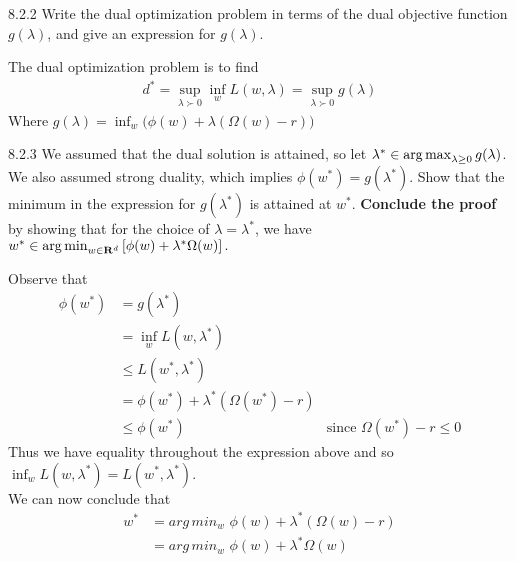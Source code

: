 \documentclass[12pt,letterpaper]{article}
\begin{document}
\begin{problem}{8.2.2}
Write the dual optimization problem in terms of the
dual objective function $g(\lambda)$, and give an expression for
$g(\lambda)$.
\end{problem}
\begin{solution}{}
    The dual optimization problem is to find
    \begin{align*}
        d^*= \sup_{\lambda\succ 0} \inf_w L(w,\lambda) = \sup_{\lambda\succ 0} g(\lambda)
    \end{align*}
    Where $g(\lambda) = \inf_w\big(\phi(w)+\lambda(\Omega(w)-r)\big)$
\end{solution}
\newpage

\begin{problem}{8.2.3}
We assumed that the dual solution is attained, so let
$\lambda^{*}\in\argmax_{\lambda\ge0}g(\lambda)$. We also assumed
strong duality, which implies $\phi(w^{*})=g(\lambda^{*})$. Show
that the minimum in the expression for $g(\lambda^{*})$ is attained
at $w^{*}$.
\textbf{Conclude the proof} by showing that for the choice of $\lambda=\lambda^{*}$,
we have $w^{*}\in\argmin_{w\in\reals^{d}}\left[\phi(w)+\lambda^{*}\Omega(w)\right].$
\end{problem}
\begin{solution}{}
    Observe that
    \begin{align*}
        \phi(w^*) &= g(\lambda^*)\\
        &= \inf_w L(w,\lambda^*)\\
        &\leq  L(w^*,\lambda^*)\\
        &= \phi(w^*) + \lambda^*(\Omega(w^*) - r)\\
        &\leq \phi(w^*) & \text{since $\Omega(w^*)-r\leq0$}
    \end{align*}
    Thus we have equality throughout the expression above and so $\inf_w L(w,\lambda^*) = L(w^*,\lambda^*)$.\\
    We can now conclude that
    \begin{align*}
        w^* &= arg\,min_w\,\, \phi(w) + \lambda^*(\Omega(w)-r)\\
        &= arg\,min_w\,\, \phi(w) + \lambda^*\Omega(w)
    \end{align*}
\end{solution}
\end{document}
